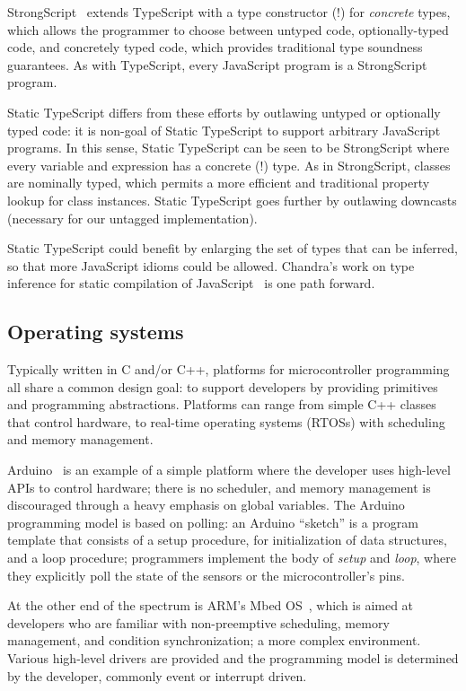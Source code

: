 StrongScript~\cite{StrongScriptECOOP15} extends TypeScript with a type constructor (!)
for \emph{concrete} types, which allows the programmer to choose between untyped
code, optionally-typed code, and concretely typed code, which provides traditional
type soundness guarantees. As with TypeScript, every JavaScript program is a StrongScript program. 

Static TypeScript differs from these efforts by outlawing untyped or optionally typed
code: it is non-goal of Static TypeScript to support arbitrary JavaScript programs.
In this sense, Static TypeScript can be seen to be StrongScript where every variable and 
expression has a concrete (!) type. As in StrongScript, classes are nominally typed,
which permits a more efficient and traditional property lookup for class instances. 
Static TypeScript goes further by outlawing downcasts (necessary for our untagged 
implementation).

Static TypeScript could benefit by enlarging the set of types
that can be inferred, so that more JavaScript idioms could be allowed. 
Chandra's work on type inference for static compilation of 
JavaScript~\cite{ChandraOOPSLA2016} is one path forward. 

\subsection{Operating systems}

Typically written in C and/or C++, platforms for microcontroller programming all share 
a common design goal: to support developers by providing primitives and programming 
abstractions. Platforms can range from simple C++ classes that control hardware, 
to real-time operating systems (RTOSs) with scheduling and memory management.

Arduino~\cite{buildingArduino2014} is an example of a simple platform where the developer uses 
high-level APIs to control hardware; there is no scheduler, and memory management 
is discouraged through a heavy emphasis on global variables.  The Arduino programming 
model is based on polling: an Arduino ``sketch'' is a program template that consists 
of a setup procedure, for initialization of data structures, and a loop procedure; 
programmers implement the body of \textit{setup} and \textit{loop}, where they explicitly 
poll the state of the sensors or the microcontroller's pins.

At the other end of the spectrum is ARM's Mbed OS~\cite{ARMmbed}, which is aimed at developers who are familiar 
with non-preemptive scheduling, memory management, and condition synchronization; a more 
complex environment. Various high-level drivers are provided and the programming model 
is determined by the developer, commonly event or interrupt driven.


